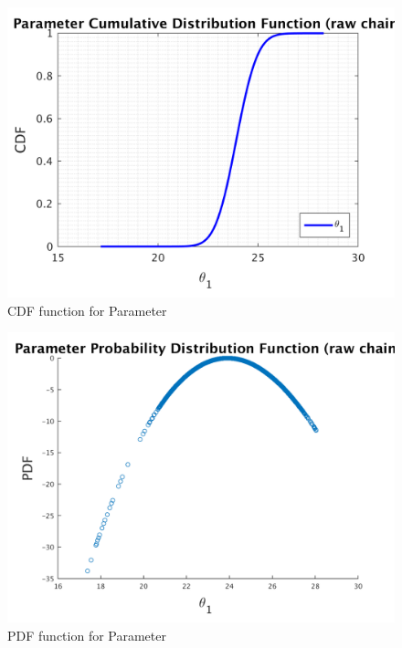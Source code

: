 \begin{figure}[H]
  
  \centering
   \includegraphics[scale=0.75]{100_results/outputData_50/simple_ip_cdf_raw}
   \caption{CDF function for Parameter }
\end{figure}



\begin{figure}[H]
  
  \centering
   \includegraphics[scale=0.75]{100_results/outputData_50/ip_logLike_unified}
   \caption{PDF function for Parameter }
\end{figure}



